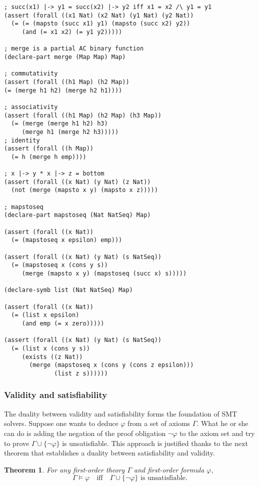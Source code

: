\documentclass{article}
\theoremstyle{plain}
\newtheorem{thm}{Theorem}
\begin{document}
\begin{lstlisting}
; succ(x1) |-> y1 = succ(x2) |-> y2 iff x1 = x2 /\ y1 = y1
(assert (forall ((x1 Nat) (x2 Nat) (y1 Nat) (y2 Nat))
  (= (= (mapsto (succ x1) y1) (mapsto (succ x2) y2))
     (and (= x1 x2) (= y1 y2)))))

; merge is a partial AC binary function
(declare-part merge (Map Map) Map)

; commutativity
(assert (forall ((h1 Map) (h2 Map))
(= (merge h1 h2) (merge h2 h1))))

; associativity
(assert (forall ((h1 Map) (h2 Map) (h3 Map))
  (= (merge (merge h1 h2) h3)
     (merge h1 (merge h2 h3)))))
; identity
(assert (forall ((h Map))
  (= h (merge h emp))))

; x |-> y * x |-> z = bottom
(assert (forall ((x Nat) (y Nat) (z Nat))
  (not (merge (mapsto x y) (mapsto x z)))))

; mapstoseq
(declare-part mapstoseq (Nat NatSeq) Map)

(assert (forall ((x Nat))
  (= (mapstoseq x epsilon) emp)))

(assert (forall ((x Nat) (y Nat) (s NatSeq))
  (= (mapstoseq x (cons y s))
     (merge (mapsto x y) (mapstoseq (succ x) s)))))

(declare-symb list (Nat NatSeq) Map)

(assert (forall ((x Nat))
  (= (list x epsilon)
     (and emp (= x zero)))))

(assert (forall ((x Nat) (y Nat) (s NatSeq))
  (= (list x (cons y s))
     (exists ((z Nat))
       (merge (mapstoseq x (cons y (cons z epsilon)))
              (list z s))))))

\end{lstlisting}

\subsubsection*{Validity and satisfiability}
The duality between validity and satisfiability forms the foundation of SMT solvers. Suppose one wants to deduce $\varphi$ from a set of axioms $\Gamma$. What he or she can do is adding the negation of the proof obligation $\neg \varphi$ to the axiom set and try to prove $\Gamma \cup \{\neg \varphi\}$ is unsatisfiable. This approach is justified thanks to the next theorem that establishes a duality between satisfiability and validity.

\begin{thm}
  For any first-order theory $\Gamma$ and first-order formula $\varphi$, 
  \begin{equation*}
  \Gamma \models \varphi \quad \text{iff} \quad \Gamma \cup \{\neg \varphi\} \text{ is unsatisfiable.}  
  \end{equation*}
\end{thm}
\end{document}
